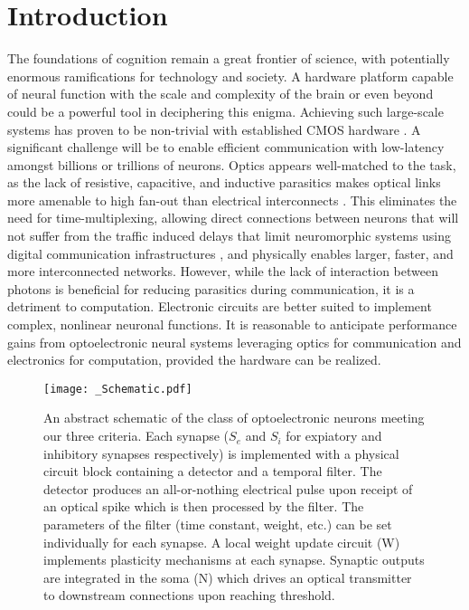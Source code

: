 \documentclass[twocolumn]{article}
\begin{document}
\section{\label{sec:introduction}Introduction}
The foundations of cognition remain a great frontier of science, with potentially enormous ramifications for technology and society. A hardware platform capable of neural function with the scale and complexity of the brain or even beyond could be a powerful tool in deciphering this enigma. Achieving such large-scale systems has proven to be non-trivial with established CMOS hardware \cite{furber2016large}. A significant challenge will be to enable efficient communication with low-latency amongst billions or trillions of neurons. Optics appears well-matched to the task, as the lack of resistive, capacitive, and inductive parasitics makes optical links more amenable to high fan-out than electrical interconnects \cite{shainline2019superconducting}. This eliminates the need for time-multiplexing, allowing direct connections between neurons that will not suffer from the traffic induced delays that limit neuromorphic systems using digital communication infrastructures \cite{young2019review}, and physically enables larger, faster, and more interconnected networks. However, while the lack of interaction between photons is beneficial for reducing parasitics during communication, it is a detriment to computation. Electronic circuits are better suited to implement complex, nonlinear neuronal functions. It is reasonable to anticipate performance gains from optoelectronic neural systems leveraging optics for communication and electronics for computation, provided the hardware can be realized.

\begin{figure*}
    \centering
    \texttt{[image: \_Schematic.pdf]}
    \caption{An abstract schematic of the class of optoelectronic neurons meeting our three criteria. Each synapse ($S_e$ and $S_i$ for expiatory and inhibitory synapses respectively) is implemented with a physical circuit block containing a detector and a temporal filter. The detector produces an all-or-nothing electrical pulse upon receipt of an optical spike which is then processed by the filter. The parameters of the filter (time constant, weight, etc.) can be set individually for each synapse. A local weight update circuit (W) implements plasticity mechanisms at each synapse. Synaptic outputs are integrated in the soma (N) which drives an optical transmitter to downstream connections upon reaching threshold.}
    \label{fig:Schematic}
\end{figure*}
\end{document}
